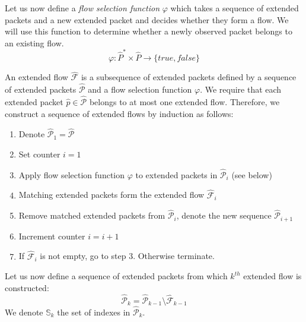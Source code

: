 Let us now define a \emph{flow selection function} $\varphi$ which takes a sequence of extended packets and a new extended packet and decides whether they form a flow. We will use this function to determine whether a newly observed packet belongs to an existing flow.
\begin{equation}
 	\varphi: \widehat{P}^*\times \widehat{P} \to \{true,false\}
\end{equation}

An extended flow $\widehat{\mathcal{F}}$ is a subsequence of extended packets defined by a sequence of extended packets $\widehat{\mathcal{P}}$ and a flow selection function $\varphi$. We require that each extended packet $\widehat{p} \in \widehat{\mathcal{P}}$ belongs to at most one extended flow. Therefore, we construct a sequence of extended flows by induction as follows:
\begin{enumerate}[noitemsep]
	\item Denote $\widehat{\mathcal{P}}_1 = \widehat{\mathcal{P}}$
	\item Set counter $i = 1$
	\item Apply flow selection function $\varphi$ to extended packets in $\widehat{\mathcal{P}}_i$ (see below)
	\item Matching extended packets form the extended flow $\widehat{\mathcal{F}}_i$
	\item Remove matched extended packets from $\widehat{\mathcal{P}}_i$, denote the new sequence $\widehat{\mathcal{P}}_{i+1}$
	\item Increment counter $i = i + 1$
	\item If $\widehat{\mathcal{F}}_i$ is not empty, go to step 3. Otherwise terminate.
\end{enumerate}

Let us now define a sequence of extended packets from which $k^{th}$ extended flow is constructed:
\begin{equation*}
\widehat{\mathcal{P}}_k = \widehat{\mathcal{P}}_{k-1} \setminus \widehat{\mathcal{F}}_{k-1}
\end{equation*}
We denote $\mathbb{S}_k$ the set of indexes in $\widehat{\mathcal{P}}_k$.


